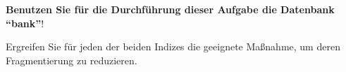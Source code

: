 \item \textbf{Benutzen Sie für die Durchführung dieser Aufgabe die
Datenbank \enquote{bank}}!

Ergreifen Sie für jeden der beiden Indizes die geeignete Maßnahme, um
deren Fragmentierung zu reduzieren.
